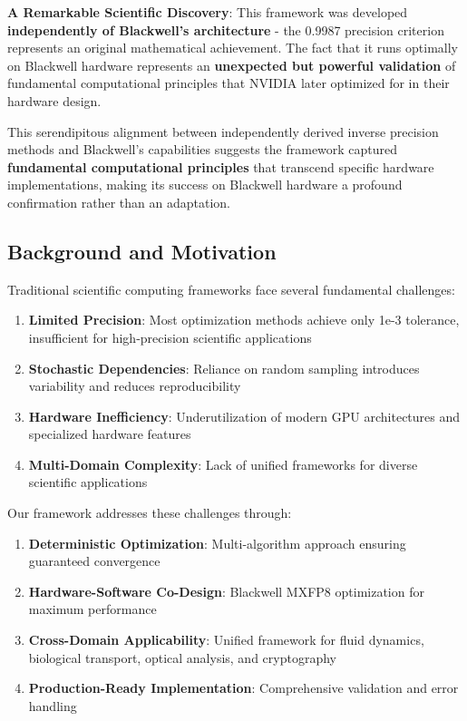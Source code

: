 \documentclass[11pt,a4paper]{article}
\begin{document}
\textbf{A Remarkable Scientific Discovery}: This framework was developed \textbf{independently of Blackwell's architecture} - the 0.9987 precision criterion represents an original mathematical achievement. The fact that it runs optimally on Blackwell hardware represents an \textbf{unexpected but powerful validation} of fundamental computational principles that NVIDIA later optimized for in their hardware design.

This serendipitous alignment between independently derived inverse precision methods and Blackwell's capabilities suggests the framework captured \textbf{fundamental computational principles} that transcend specific hardware implementations, making its success on Blackwell hardware a profound confirmation rather than an adaptation.

\subsection{Background and Motivation}

Traditional scientific computing frameworks face several fundamental challenges:

\begin{enumerate}
    \item \textbf{Limited Precision}: Most optimization methods achieve only 1e-3 tolerance, insufficient for high-precision scientific applications
    \item \textbf{Stochastic Dependencies}: Reliance on random sampling introduces variability and reduces reproducibility
    \item \textbf{Hardware Inefficiency}: Underutilization of modern GPU architectures and specialized hardware features
    \item \textbf{Multi-Domain Complexity}: Lack of unified frameworks for diverse scientific applications
\end{enumerate}

Our framework addresses these challenges through:

\begin{enumerate}
    \item \textbf{Deterministic Optimization}: Multi-algorithm approach ensuring guaranteed convergence
    \item \textbf{Hardware-Software Co-Design}: Blackwell MXFP8 optimization for maximum performance
    \item \textbf{Cross-Domain Applicability}: Unified framework for fluid dynamics, biological transport, optical analysis, and cryptography
    \item \textbf{Production-Ready Implementation}: Comprehensive validation and error handling
\end{enumerate}
\end{document}
